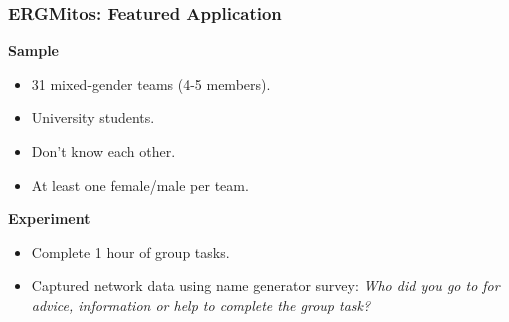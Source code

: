 \documentclass[aspectratio=169, 9pt]{beamer}
\begin{document}
\begin{frame}[c]
	\frametitle{ERGMitos: Featured Application}
	
	\begin{minipage}[t]{.38\linewidth}
		\small
	\noindent \textbf{Sample}
	\pause
	\begin{itemize}
		\item 31 mixed-gender teams (4-5 members).\pause
		\item University students.\pause
		\item Don't know each other.\pause
		\item At least one female/male per team.\pause
	\end{itemize}
	\noindent \textbf{Experiment}\pause
	\begin{itemize}
		\item Complete 1 hour of group tasks.\pause
		\item Captured network data using name generator survey: \textit{Who did you go to for advice, information or help to complete the group task?}
	\end{itemize}
	\end{minipage}
\hfill
	\begin{minipage}[t]{.6\linewidth}
		\centering
	\end{minipage}
	
\end{frame}
\end{document}

